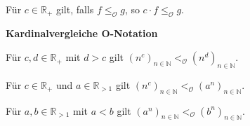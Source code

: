 \documentclass[a4paper,10pt]{article}
\newcommand{\natnum}{\mathbb{N}}
\newcommand{\realnum}{\mathbb{R}}
\newcommand{\lt}{<}
\newcommand{\gt}{>}
\newcommand{\bigOSymbol}{\mathcal{O}}
\begin{document}
\begin{multicols}{3}
Für $c \in \realnum_+$ gilt, falls $f \leq_{\bigOSymbol} g$, so $c \cdot f \leq_{\bigOSymbol} g$.

\textbf{Kardinalvergleiche O-Notation}

Für $c,d \in \realnum_+$ mit $d \gt c$ gilt $\left(n^c\right)_{n \in \natnum} \lt_{\bigOSymbol} \left(n^d\right)_{n \in \natnum}$.

Für $c \in \realnum_+$ und $a \in \realnum_{\gt 1}$ gilt $\left(n^c\right)_{n \in \natnum} \lt_{\bigOSymbol} \left(a^n\right)_{n \in \natnum}$.

Für $a,b \in \realnum_{\gt 1}$ mit $a \lt b$ gilt $\left(a^n\right)_{n \in \natnum} \lt_{\bigOSymbol} \left(b^n\right)_{n \in \natnum}$.

\end{multicols}
\end{document}
